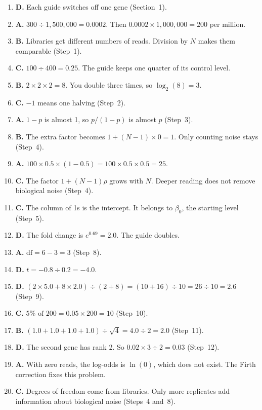 \documentclass[12pt]{article}
\begin{document}
\begin{enumerate}[label=\textbf{Q\arabic*.},leftmargin=2.6em,itemsep=6pt]
\item \textbf{D.} Each guide switches off one gene (Section~1).
\item \textbf{A.} $300 \div 1{,}500{,}000 = 0.0002$. Then
  $0.0002 \times 1{,}000{,}000 = 200$ per million.
\item \textbf{B.} Libraries get different numbers of reads. Division by $N$
  makes them comparable (Step~1).
\item \textbf{C.} $100 \div 400 = 0.25$. The guide keeps one quarter of its
  control level.
\item \textbf{B.} $2 \times 2 \times 2 = 8$. You double three times, so
  $\log_2(8) = 3$.
\item \textbf{C.} $-1$ means one halving (Step~2).
\item \textbf{A.} $1 - p$ is almost 1, so $p/(1-p)$ is almost $p$
  (Step~3).
\item \textbf{B.} The extra factor becomes $1 + (N-1) \times 0 = 1$. Only
  counting noise stays (Step~4).
\item \textbf{A.} $100 \times 0.5 \times (1 - 0.5) = 100 \times 0.5 \times
  0.5 = 25$.
\item \textbf{C.} The factor $1 + (N-1)\rho$ grows with $N$. Deeper reading
  does not remove biological noise (Step~4).
\item \textbf{C.} The column of 1s is the intercept. It belongs to
  $\beta_0$, the starting level (Step~5).
\item \textbf{D.} The fold change is $e^{0.69} = 2.0$. The guide doubles.
\item \textbf{A.} $\text{df} = 6 - 3 = 3$ (Step~8).
\item \textbf{D.} $t = -0.8 \div 0.2 = -4.0$.
\item \textbf{D.} $(2 \times 5.0 + 8 \times 2.0) \div (2 + 8) = (10 + 16)
  \div 10 = 26 \div 10 = 2.6$ (Step~9).
\item \textbf{C.} $5\% \text{ of } 200 = 0.05 \times 200 = 10$ (Step~10).
\item \textbf{B.} $(1.0+1.0+1.0+1.0) \div \sqrt{4} = 4.0 \div 2 = 2.0$
  (Step~11).
\item \textbf{D.} The second gene has rank 2. So
  $0.02 \times 3 \div 2 = 0.03$ (Step~12).
\item \textbf{A.} With zero reads, the log-odds is $\ln(0)$, which does not
  exist. The Firth correction fixes this problem.
\item \textbf{C.} Degrees of freedom come from libraries. Only more
  replicates add information about biological noise (Steps~4 and~8).


\end{enumerate}
\end{document}
